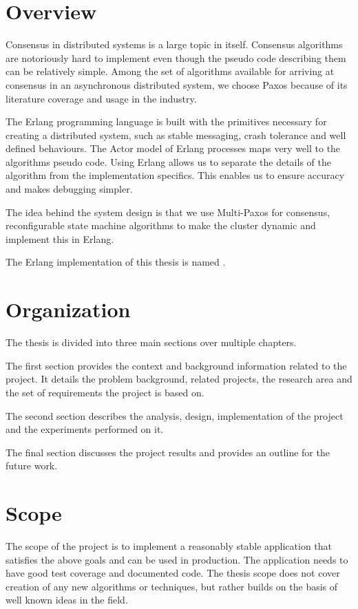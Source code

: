 \section{Overview}

Consensus in distributed systems is a large topic in itself. Consensus
algorithms are notoriously hard to implement even though the pseudo code
describing them can be relatively simple. Among the set of algorithms
available for arriving at consensus in an asynchronous distributed
system, we choose Paxos because of its literature coverage and usage
in the industry.

The Erlang programming language is built with the primitives necessary for
creating a distributed system, such as stable messaging, crash tolerance and
well defined behaviours. The Actor model of Erlang processes maps very well to
the algorithms pseudo code. Using Erlang allows us to separate the details of
the algorithm from the implementation specifics. This enables us to ensure
accuracy and makes debugging simpler.

The idea behind the system design is that we use Multi-Paxos%
 for consensus, reconfigurable state machine algorithms to make the
cluster dynamic and implement this in Erlang.

The Erlang implementation of this thesis is named .

\section{Organization}
The thesis is divided into three main sections over multiple chapters.

The first section provides the context and background information related to the
project. It details the problem background, related projects, the research
area and the set of requirements the project is based on.

The second section describes the analysis, design, implementation of the project
and the experiments performed on it.

The final section discusses the project results and provides an outline for
the future work.

\section{Scope}

The scope of the project is to implement a reasonably stable application that
satisfies the above goals and can be used in production. The application needs
to have good test coverage and documented code. The thesis scope does not cover
creation of any new algorithms or techniques, but rather builds on the basis of
well known ideas in the field.

